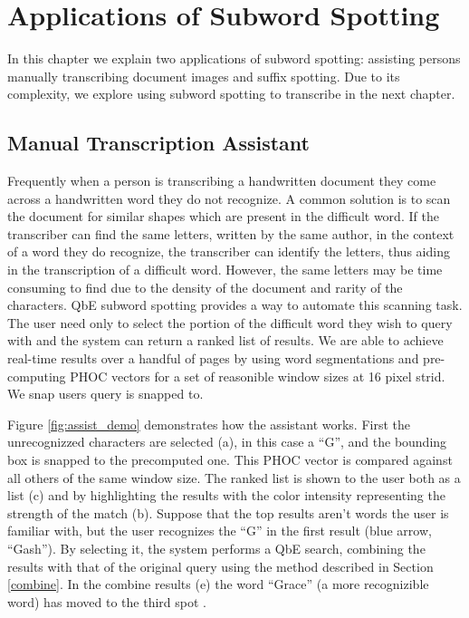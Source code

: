\documentclass[ms,electronic,twosidetoc,letterpaper,chaptercenter,parttop,lol,lof,lot]{byumsphd}
\begin{document}


\chapter{Applications of Subword Spotting}\label{applications}

In this chapter we explain two applications of subword spotting: assisting persons manually transcribing document images and suffix spotting. Due to its complexity, we explore using subword spotting to transcribe in the next chapter.

\section{Manual Transcription Assistant}
Frequently when a person is transcribing a handwritten document they come across a handwritten word they do not recognize. A common solution is to scan the document for similar shapes which are present in the difficult word. If the transcriber can find the same letters, written by the same author, in the context of a word they do recognize, the transcriber can identify the letters, thus aiding in the transcription of a difficult word. 
However, the same letters may be time consuming to find due to the density of the document and rarity of the characters. QbE subword spotting provides a way to automate this scanning task. The user need only to select the portion of the difficult word they wish to query with and the system can return a ranked list of results.
We are able to achieve real-time results over a handful of pages by using word segmentations and pre-computing PHOC vectors for a set of reasonible window sizes at 16  pixel strid. We snap users query is snapped to. 

Figure \ref{fig:assist_demo} demonstrates how the assistant works. First the unrecognizzed characters are selected (a), in this case a  ``G'', and the bounding box is snapped to the precomputed one. This PHOC vector is compared against all others of the same window size. The ranked list is shown to the user both as a list (c) and by highlighting the results with the color intensity representing the strength of the match (b). Suppose that the top results aren't words the user is familiar with, but the user recognizes the ``G'' in the first result (blue arrow, ``Gash''). By selecting it, the system performs a QbE search, combining the results with that of the original query using the method described in Section \ref{combine}. In the combine results (e) the word ``Grace'' (a more recognizible word) has moved to the third spot .
\end{document}
